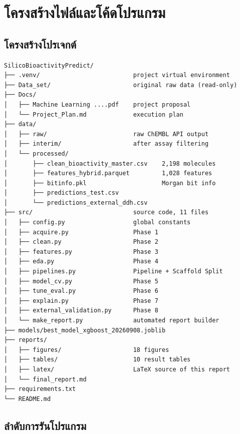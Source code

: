 
\chapter{โครงสร้างไฟล์และโค้ดโปรแกรม}

\section{โครงสร้างโปรเจกต์}

\begingroup\scriptsize
\begin{verbatim}
SilicoBioactivityPredict/
├── .venv/                          project virtual environment
├── Data_set/                       original raw data (read-only)
├── Docs/
│   ├── Machine Learning ....pdf    project proposal
│   └── Project_Plan.md             execution plan
├── data/
│   ├── raw/                        raw ChEMBL API output
│   ├── interim/                    after assay filtering
│   └── processed/
│       ├── clean_bioactivity_master.csv    2,198 molecules
│       ├── features_hybrid.parquet         1,028 features
│       ├── bitinfo.pkl                     Morgan bit info
│       ├── predictions_test.csv
│       └── predictions_external_ddh.csv
├── src/                            source code, 11 files
│   ├── config.py                   global constants
│   ├── acquire.py                  Phase 1
│   ├── clean.py                    Phase 2
│   ├── features.py                 Phase 3
│   ├── eda.py                      Phase 4
│   ├── pipelines.py                Pipeline + Scaffold Split
│   ├── model_cv.py                 Phase 5
│   ├── tune_eval.py                Phase 6
│   ├── explain.py                  Phase 7
│   ├── external_validation.py      Phase 8
│   └── make_report.py              automated report builder
├── models/best_model_xgboost_20260908.joblib
├── reports/
│   ├── figures/                    18 figures
│   ├── tables/                     10 result tables
│   ├── latex/                      LaTeX source of this report
│   └── final_report.md
├── requirements.txt
└── README.md
\end{verbatim}
\endgroup

\section{ลำดับการรันโปรแกรม}

